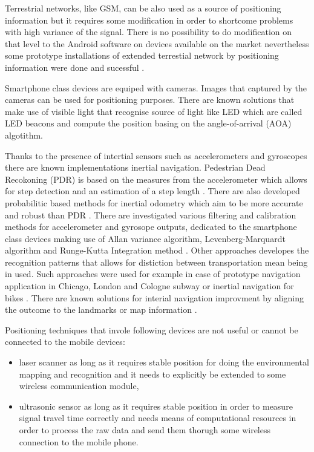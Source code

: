 \documentclass[../main.tex]{subfiles}
\begin{document}
Terrestrial networks, like GSM, can be also used as a source of positioning information but it requires some modification in order to shortcome problems with high variance of the signal. There is no possibility to do modification on that level to the Android software on devices available on the market nevertheless some prototype installations of extended terrestial network by positioning information were done and sucessful \cite{terrestrial_positioning}\cite{terrestrial_positioning_tdoa}.

Smartphone class devices are equiped with cameras. Images that captured by the cameras can be used for positioning purposes. There are known solutions that make use of visible light \cite{visible_light_positioning} that recognise source of light like LED which are called LED beacons and compute the position basing on the angle-of-arrival (AOA) algotithm.

Thanks to the presence of intertial sensors such as accelerometers and gyroscopes there are known implementations inertial navigation. Pedestrian Dead Recokoning (PDR) is based on the measures from the accelerometer which allows for step detection and an estimation of a step length \cite{inertial_navi_unaided} \cite{inertial_navi_pocket} \cite{inertial_navi_velocity_model}. There are also developed probabilitic based methods for inertial odometry which aim to be more accurate and robust than PDR \cite{article_inertial_navi_handheld_prob}. There are investigated various filtering and calibration methods for accelerometer and gyrosope outputs, dedicated to the smartphone class devices making use of Allan variance algorithm, Levenberg-Marquardt algorithm and Runge-Kutta Integration method \cite{article_intertial_test_smartphone_calibration}\cite{article_intertial_calibration}.  Other approaches developes the recognition patterns that allows for distiction between transportation mean being in used. Such approaches were used for example in case of prototype navigation application in Chicago, London and Cologne subway \cite{inertial_navi_subway} or inertial navigation for bikes \cite{inertial_navi_bike}. There are known solutions for interial navigation improvment by aligning the outcome to the landmarks or map information \cite{positioning_tests}.

Positioning techniques that invole following devices are not useful or cannot be connected to the mobile devices:
\begin{itemize}
	\item laser scanner as long as it requires stable position for doing the environmental mapping and recognition and it needs to explicitly be extended to some wireless communication module,
	\item ultrasonic sensor as long as it requires stable position in order to measure signal travel time correctly and needs means of computational resources in order to process the raw data and send them thorugh some wireless connection to the mobile phone.
\end{itemize}
\end{document}
